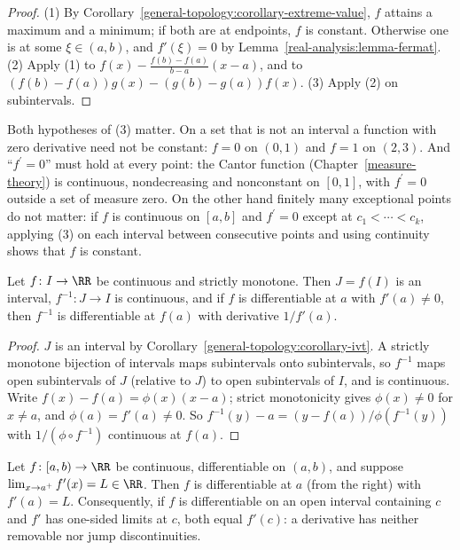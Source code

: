 \begin{proof}
(1) By Corollary~\ref{general-topology:corollary-extreme-value}, $f$ attains a maximum and a minimum; if both are at endpoints, $f$ is constant. Otherwise one is at some
$\xi \in (a, b)$, and $f'(\xi) = 0$ by Lemma~\ref{real-analysis:lemma-fermat}. (2) Apply (1) to $f(x) - \frac{f(b) - f(a)}{b - a}(x - a)$, and to
$(f(b) - f(a))g(x) - (g(b) - g(a))f(x)$. (3) Apply (2) on subintervals.
\end{proof}

\begin{remark}\label{real-analysis:remark-derivative-zero}
Both hypotheses of (3) matter. On a set that is not an interval a function with zero derivative need not be constant: $f = 0$ on $(0, 1)$ and $f = 1$ on $(2, 3)$. And ``$f^{\prime} = 0$'' must hold at
every point: the Cantor function (Chapter~\ref{measure-theory}) is continuous, nondecreasing and nonconstant on $[0, 1]$, with $f^{\prime} = 0$ outside a set of measure zero. On the other hand finitely
many exceptional points do not matter: if $f$ is continuous on $[a, b]$ and $f^{\prime} = 0$ except at $c_1 < \cdots < c_k$, applying (3) on each interval between consecutive points and using continuity
shows that $f$ is constant.
\end{remark}

\begin{proposition}\label{real-analysis:proposition-inverse-one}
Let $f \colon I \to \RR$ be continuous and strictly monotone. Then $J = f(I)$ is an interval, $f^{-1} \colon J \to I$ is continuous, and if $f$ is differentiable at $a$ with
$f'(a) \neq 0$, then $f^{-1}$ is differentiable at $f(a)$ with derivative $1/f'(a)$.
\end{proposition}

\begin{proof}
$J$ is an interval by Corollary~\ref{general-topology:corollary-ivt}. A strictly monotone bijection of intervals maps subintervals onto subintervals, so $f^{-1}$ maps open subintervals of $J$
(relative to $J$) to open subintervals of $I$, and is continuous. Write $f(x) - f(a) = \phi(x)(x - a)$; strict monotonicity gives $\phi(x) \neq 0$ for $x \neq a$, and $\phi(a) = f'(a) \neq 0$. So
$f^{-1}(y) - a = (y - f(a))/\phi(f^{-1}(y))$ with $1/(\phi \circ f^{-1})$ continuous at $f(a)$.
\end{proof}

\begin{proposition}\label{real-analysis:proposition-derivative-limit}
Let $f \colon [a, b) \to \RR$ be continuous, differentiable on $(a, b)$, and suppose $\lim_{x \to a^+}f'(x) = L \in \RR$. Then $f$ is differentiable at $a$ (from the right) with $f'(a) = L$. Consequently, if $f$ is
differentiable on an open interval containing $c$ and $f'$ has one-sided limits at $c$, both equal $f'(c)$: a derivative has neither removable nor jump discontinuities.
\end{proposition}

